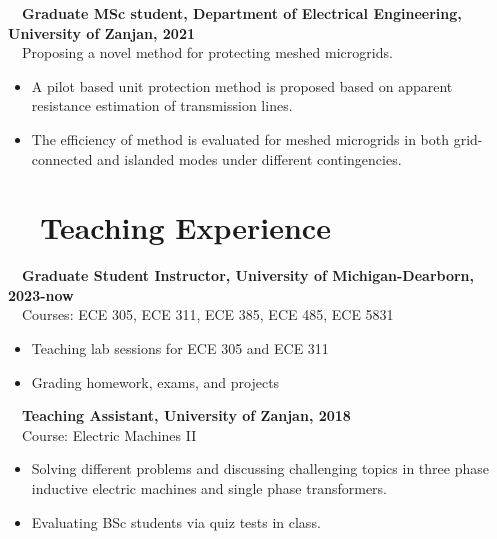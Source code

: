 \documentclass[a4paper,8pt]{article}
\begin{document}
~~\textbf{Graduate MSc student, Department of Electrical Engineering, University of Zanjan, 2021}\\
~~Proposing a novel method for protecting meshed microgrids.
\begin{itemize}
    \item A pilot based unit protection method is proposed based on apparent resistance estimation of transmission lines.  
    \item The efficiency of method is evaluated for meshed microgrids in both grid-connected and islanded modes under different contingencies. 
\end{itemize}


\section{~~Teaching Experience}

~~\textbf{Graduate Student Instructor, University of Michigan-Dearborn, 2023-now}\\
~~Courses: ECE 305, ECE 311, ECE 385, ECE 485, ECE 5831
\begin{itemize}
    \item Teaching lab sessions for ECE 305 and ECE 311
    \item Grading homework, exams, and projects
\end{itemize}

~~\textbf{Teaching Assistant, University of Zanjan, 2018}\\
~~Course: Electric Machines II\\
\begin{itemize}
    \item Solving different problems and discussing challenging topics in three phase inductive electric machines and single phase transformers.   
    \item Evaluating BSc students via quiz tests in class.
\end{itemize}
\end{document}
